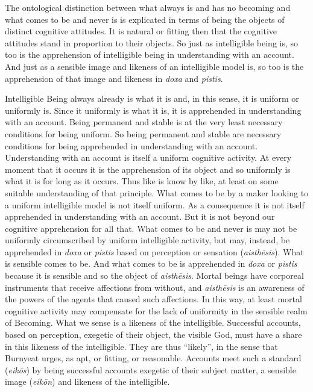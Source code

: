The ontological distinction between what always is and has no becoming and what comes to be and never is is explicated in terms of being the objects of distinct cognitive attitudes. It is natural or fitting then that the cognitive attitudes stand in proportion to their objects. So just as intelligible being is, so too is the apprehension of intelligible being in understanding with an account. And just as a sensible image and likeness of an intelligible model is, so too is the apprehension of that image and likeness in \emph{doxa} and \emph{pistis}. 

Intelligible Being always already is what it is and, in this sense, it is uniform or uniformly is. Since it uniformly is what it is, it is apprehended in understanding with an account. Being permanent and stable is at the very least necessary conditions for being uniform. So being permanent and stable are necessary conditions for being apprehended in understanding with an account. Understanding with an account is itself a uniform cognitive activity. At every moment that it occurs it is the apprehension of its object and so uniformly is what it is for long as it occurs. Thus like is know by like, at least on some suitable understanding of that principle. What comes to be by a maker looking to a uniform intelligible model is not itself uniform. As a consequence it is not itself apprehended in understanding with an account. But it is not beyond our cognitive apprehension for all that. What comes to be and never is may not be uniformly circumscribed by uniform intelligible activity, but may, instead, be apprehended in \emph{doxa} or \emph{pistis} based on perception or sensation (\emph{aisthēsis}). What is sensible comes to be. And what comes to be is apprehended in \emph{doxa} or \emph{pistis} because it is sensible and so the object of \emph{aisthēsis}. Mortal beings have corporeal instruments that receive affections from without, and \emph{aisthēsis} is an awareness of the powers of the agents that caused such affections. In this way, at least mortal cognitive activity may compensate for the lack of uniformity in the sensible realm of Becoming. What we sense is a likeness of the intelligible. Successful accounts, based on perception, exegetic of their object, the visible God, must have a share in this likeness of the intelligible. They are thus ``likely'', in the sense that Burnyeat urges, as apt, or fitting, or reasonable. Accounts meet such a standard (\emph{eikōs}) by being successful accounts exegetic of their subject matter, a sensible image  (\emph{eikōn}) and likeness of the intelligible.

